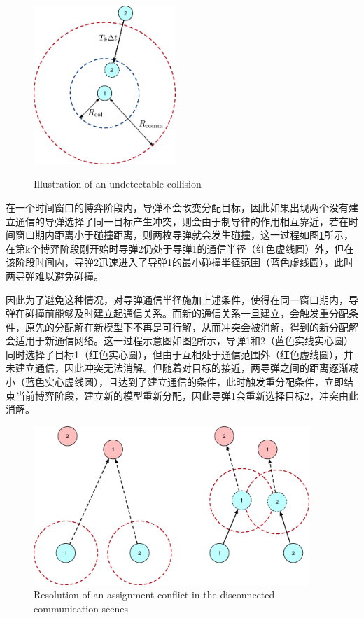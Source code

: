 \begin{figure}[!htp]
  \centering
  \includegraphics[height=6cm]{stochastic_game/undetectable_collision.eps}
  
  {Illustration of an undetectable collision}
  \label{fig:undetectable_collision}
\end{figure}

在一个时间窗口的博弈阶段内，导弹不会改变分配目标，因此如果出现两个没有建立通信的导弹选择了同一目标产生冲突，则会由于制导律的作用相互靠近，若在时间窗口期内距离小于碰撞距离，则两枚导弹就会发生碰撞，这一过程如图\ref{fig:undetectable_collision}所示，在第k个博弈阶段刚开始时导弹2仍处于导弹1的通信半径（红色虚线圆）外，但在该阶段时间内，导弹2迅速进入了导弹1的最小碰撞半径范围（蓝色虚线圆），此时两导弹难以避免碰撞。

因此为了避免这种情况，对导弹通信半径施加上述条件，使得在同一窗口期内，导弹在碰撞前能够及时建立起通信关系。而新的通信关系一旦建立，会触发重分配条件，原先的分配解在新模型下不再是可行解，从而冲突会被消解，得到的新分配解会适用于新通信网络。这一过程示意图如图\ref{fig:collision_resolution}所示，导弹1和2（蓝色实线实心圆）同时选择了目标1（红色实心圆），但由于互相处于通信范围外（红色虚线圆），并未建立通信，因此冲突无法消解。但随着对目标的接近，两导弹之间的距离逐渐减小（蓝色实心虚线圆），且达到了建立通信的条件，此时触发重分配条件，立即结束当前博弈阶段，建立新的模型重新分配，因此导弹1会重新选择目标2，冲突由此消解。

\begin{figure}[!htp]
  \centering
  \includegraphics[height=6cm]{stochastic_game/collision_resolution}
  {Resolution of an assignment conflict in the disconnected communication scenes}
  \label{fig:collision_resolution}
\end{figure}

